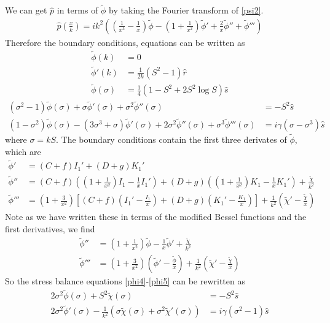 \documentclass[12pt]{article}
\begin{document}
We can get $\hat p$ in terms of $\tilde\phi$ by taking the Fourier transform of \eqref{psi2}.
\begin{align}
\hat p\left(\frac{x}{k}\right)=ik^2\left(\left(\frac{1}{x^3}-\frac{1}{x}\right)\tilde\phi-\left(1+\frac{1}{x^2}\right)\tilde \phi'+\frac{2}{x}\tilde\phi''+\tilde\phi'''\right)
\end{align}
Therefore the boundary conditions, equations  can be written as
\begin{align}
\tilde\phi(k)&=0\label{phi1}\\
\tilde\phi'(k)&=\frac{1}{2k}\left(S^2-1\right)\hat r\label{phi2}\\
\tilde\phi(\sigma)&=\frac{1}{4}\left(1-S^2+2S^2\log S\right)\hat{s}\label{phi3}
\end{align}
\begin{align}
(\sigma^2-1)\tilde\phi(\sigma)+\sigma\tilde\phi'(\sigma)+\sigma^2\tilde\phi''(\sigma)&=-S^2\hat s\label{phi4}\\
\left(1- \sigma^2\right)\tilde\phi(\sigma)-(3\sigma^3+\sigma)\tilde\phi'(\sigma)+2\sigma^2\tilde\phi''(\sigma)+\sigma^3\tilde\phi'''(\sigma)&=i\gamma(\sigma-\sigma^3)\hat s \label{phi5}
\end{align}
where $\sigma=kS$. The boundary conditions contain the first three derivates of $\tilde\phi$, which are
\begin{align}
\tilde\phi'%
&=(C+f)I_1'+(D+g)K_1'\\
\tilde\phi''%
&=(C+f)\left(\left(1+\frac{1}{x^2}\right)I_1-\frac{1}{x}I_1'\right)+(D+g)\left(\left(1+\frac{1}{x^2}\right)K_1-\frac{1}{x}K_1'\right)+\frac{\tilde\chi}{k^2}\\
\tilde\phi'''& =\left(1+\frac{3}{x^2}\right)\left[(C+f)\left(I_1'-\frac{I_1}{x}\right)+(D+g)\left(K_1'-\frac{K_1}{x}\right)\right] +\frac{1}{k^2}\left(\tilde\chi'-\frac{\tilde\chi}{x}\right)
\end{align}
Note as we have written these in terms of the modified Bessel functions and the first derivatives, we find
\begin{align}
\tilde\phi'' & = \left(1+\frac{1}{x^2}\right)\tilde\phi-\frac{1}{x}\tilde\phi' + \frac{\tilde\chi}{k^2}\\
\tilde\phi'''& =  \left(1+\frac{3}{x^2}\right)\left(\tilde\phi'-\frac{\tilde\phi}{x}\right)+ \frac{1}{k^2}\left(\tilde\chi'-\frac{\tilde\chi}{x} \right)
\end{align}
So the stress balance equations \eqref{phi4}-\eqref{phi5} can be rewritten as
\begin{align}
2\sigma^2\tilde\phi(\sigma) + S^2\tilde\chi(\sigma)&= -S^2\hat s\label{phi4_good}\\
2\sigma^2\tilde\phi'(\sigma)-\frac{1}{k^2}\left(\sigma\tilde\chi(\sigma)+\sigma^2\tilde\chi'(\sigma) \right)\label{phi5_good} & = i\gamma(\sigma^2-1)\hat s
\end{align}
\end{document}
